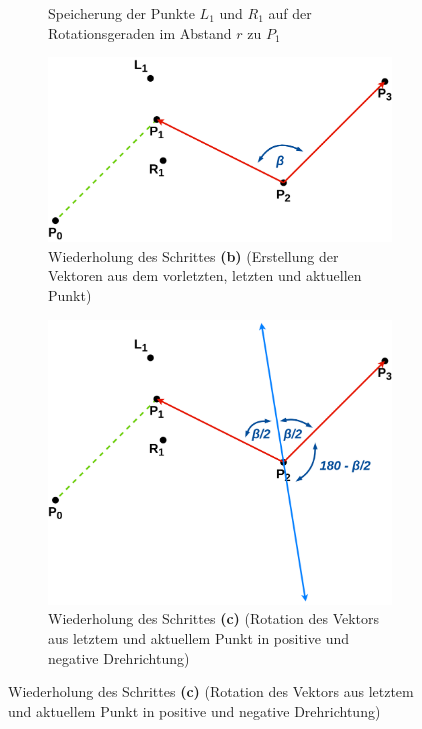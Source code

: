 \documentclass[doktyp=studarbeit]{TUBAFarbeiten}
\begin{document}
\begin{figure}[!htb]
\begin{subfigure}[b]{0.35\textwidth}
        \caption{Speicherung der Punkte $L_{1}$ und $R_{1}$ auf der
        Rotationsgeraden im Abstand $r$ zu $P_{1}$}
    \end{subfigure}
    \qquad
    \begin{subfigure}[b]{0.35\textwidth}
        \centering
        \includegraphics[width=1\linewidth]{Schlangenlinie-5.png}
        \caption{Wiederholung des Schrittes \textbf{(b)} (Erstellung der
        Vektoren aus dem vorletzten, letzten und aktuellen Punkt)}
    \end{subfigure}
    \qquad
    \begin{subfigure}[b]{0.35\textwidth}
        \centering
        \includegraphics[width=1\linewidth]{Schlangenlinie-6.png}
        \caption{Wiederholung des Schrittes \textbf{(c)} 
        (Rotation des Vektors aus letztem und aktuellem Punkt in positive und 
        negative Drehrichtung)}

\end{subfigure}
\end{figure}
\end{document}
